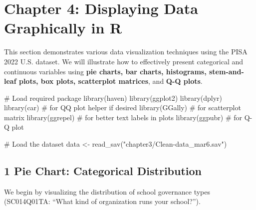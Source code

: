 \documentclass[
  letterpaper,
  DIV=11,
  numbers=noendperiod]{scrreprt}
\newenvironment{Shaded}{\begin{snugshade}}{\end{snugshade}}
\newcommand{\CommentTok}[1]{\textcolor[rgb]{0.37,0.37,0.37}{#1}}
\newcommand{\FunctionTok}[1]{\textcolor[rgb]{0.28,0.35,0.67}{#1}}
\newcommand{\NormalTok}[1]{\textcolor[rgb]{0.00,0.23,0.31}{#1}}
\newcommand{\OtherTok}[1]{\textcolor[rgb]{0.00,0.23,0.31}{#1}}
\newcommand{\StringTok}[1]{\textcolor[rgb]{0.13,0.47,0.30}{#1}}
\begin{document}

\chapter*{Chapter 4: Displaying Data Graphically in
R}\label{chapter-4-displaying-data-graphically-in-r}


This section demonstrates various data visualization techniques using
the PISA 2022 U.S. dataset. We will illustrate how to effectively
present categorical and continuous variables using \textbf{pie charts,
bar charts, histograms, stem-and-leaf plots, box plots, scatterplot
matrices}, and \textbf{Q-Q plots}.

\begin{Shaded}
\begin{Highlighting}[]
\CommentTok{\# Load required package }
\FunctionTok{library}\NormalTok{(haven) }
\FunctionTok{library}\NormalTok{(ggplot2) }
\FunctionTok{library}\NormalTok{(dplyr) }
\FunctionTok{library}\NormalTok{(car)        }\CommentTok{\# for QQ plot helper if desired }
\FunctionTok{library}\NormalTok{(GGally)     }\CommentTok{\# for scatterplot matrix }
\FunctionTok{library}\NormalTok{(ggrepel)    }\CommentTok{\# for better text labels in plots }
\FunctionTok{library}\NormalTok{(ggpubr)     }\CommentTok{\# for Q{-}Q plot }
 
\CommentTok{\# Load the dataset }
\NormalTok{data }\OtherTok{\textless{}{-}} \FunctionTok{read\_sav}\NormalTok{(}\StringTok{"chapter3/Clean{-}data\_mar6.sav"}\NormalTok{) }
\end{Highlighting}
\end{Shaded}

\section*{1 Pie Chart: Categorical
Distribution}\label{pie-chart-categorical-distribution}


We begin by visualizing the distribution of school governance types
(SC014Q01TA: ``What kind of organization runs your school?'').
\end{document}
